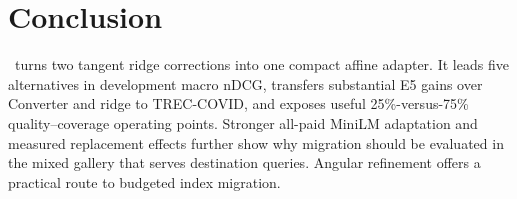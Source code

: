 \section{Conclusion}
\method\ turns two tangent ridge corrections into one compact affine adapter.
It leads five alternatives in development macro nDCG, transfers substantial
E5 gains over Converter and ridge to TREC-COVID, and exposes useful
25\%-versus-75\% quality--coverage operating points. Stronger all-paid
MiniLM adaptation and measured replacement effects further show why
migration should be evaluated in the mixed gallery that serves destination
queries. Angular refinement offers a practical route to budgeted index migration.
